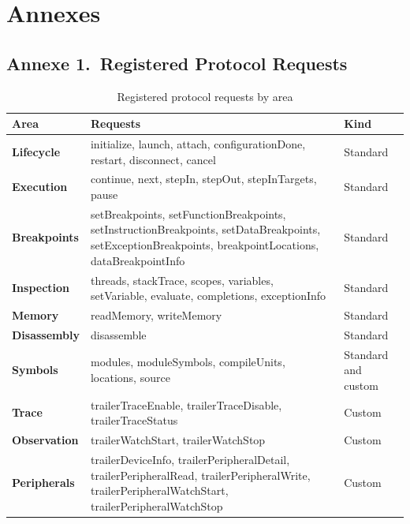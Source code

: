 \chapter*{Annexes}

\section*{Annexe 1.~Registered Protocol Requests}

\begin{table}[H]
    \centering
    \caption{Registered protocol requests by area}
    \label{tab:handlers}
    \begin{tabularx}{\linewidth}{| @{}>{\hsize\bfseries}Y | >{\hsize}Y | >{\hsize}Y@{} |}
        \hline
        Area & \textbf{Requests} & \textbf{Kind} \\
        \hline
        Lifecycle & initialize, launch, attach, configurationDone, restart, disconnect, cancel & Standard \\
        \hline
        Execution & continue, next, stepIn, stepOut, stepInTargets, pause & Standard \\
        \hline
        Breakpoints & setBreakpoints, setFunctionBreakpoints, setInstructionBreakpoints, setDataBreakpoints, setExceptionBreakpoints, breakpointLocations, dataBreakpointInfo & Standard \\
        \hline
        Inspection & threads, stackTrace, scopes, variables, setVariable, evaluate, completions, exceptionInfo & Standard \\
        \hline
        Memory & readMemory, writeMemory & Standard \\
        \hline
        Disassembly & disassemble & Standard \\
        \hline
        Symbols & modules, moduleSymbols, compileUnits, locations, source & Standard and custom \\
        \hline
        Trace & trailerTraceEnable, trailerTraceDisable, trailerTraceStatus & Custom \\
        \hline
        Observation & trailerWatchStart, trailerWatchStop & Custom \\
        \hline
        Peripherals & trailerDeviceInfo, trailerPeripheralDetail, trailerPeripheralRead, trailerPeripheralWrite, trailerPeripheralWatchStart, trailerPeripheralWatchStop & Custom \\
        \hline
    \end{tabularx}
\end{table}

